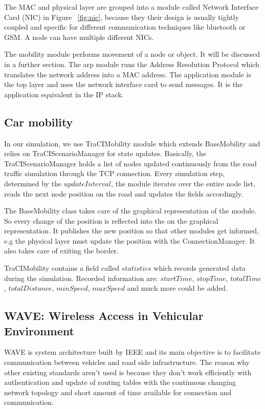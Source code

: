 The MAC and physical layer are grouped into a module called Network Interface
Card (NIC) in Figure ~\ref{fig:nic}, because they their design is usually
tightly coupled and specific for different communication techniques like
bluetooth or GSM. A node can have multiple different NICs.

The mobility module performs movement of a node or object. It will be discussed
in a further section. The arp module runs the Address Resolution Protocol which
translates the network address into a MAC address. The application module is the
top layer and uses the network interface card to send messages. It is the
application equivalent in the IP stack.

\subsection{Car mobility}

In our simulation, we use TraCIMobility module which extends BaseMobility and
relies on TraCIScenarioManager for state updates. Basically, the
TraCIScenarioManager holds a list of nodes updated continuously from the road
traffic simulation through the TCP connection. Every simulation step, determined
by the $updateInterval$, the module iterates over the entire node list, reads
the next node position on the road and updates the fields accordingly.

The BaseMobility class takes care of the graphical representation of the module.
So every change of the position is reflected into the on the graphical
representation. It publishes the new position so that other modules get
informed, e.g the physical layer must update the position with the
ConnectionManager. It also takes care of exiting the border.

TraCIMobility contains a field called $statistics$ which records generated data
during the simulation. Recorded information are: $startTime$, $stopTime$,
$totalTime$, $totalDistance$, $minSpeed$, $maxSpeed$ and much more could be
added.

\subsection{WAVE: Wireless Access in Vehicular Environment}

WAVE is system architecture built by IEEE and its main objective is to
facilitate communication between vehicles and road side infrastructure. The
reason why other existing standards aren't used is because they don't work
efficiently with authentication and update of routing tables with the continuous
changing network topology and short amount of time available for connection and
communication.

